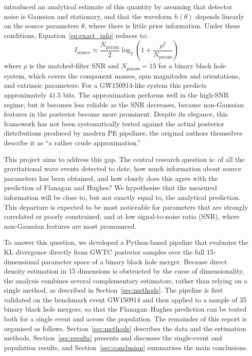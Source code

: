 \documentclass{phys400finalreport}
\begin{document}
\citet{Flanagan1998} introduced an analytical estimate of this quantity by
assuming that detector noise is Gaussian and stationary, and that the waveform
$h(\theta)$ depends linearly on the source parameters $\theta$, where there is
little prior information. Under these conditions, Equation~\ref{eq:exact_info}
reduces to:
\begin{equation}
I_\mathrm{source} \approx \frac{N_\mathrm{param}}{2} \log_2\left(1 + \frac{\rho^2}{N_\mathrm{param}}\right)
\label{eq:approx_info}
\end{equation}
where $\rho$ is the matched-filter SNR and $N_\mathrm{param} = 15$ for a binary
black hole system, which covers the component masses, spin magnitudes and
orientations, and extrinsic parameters. For a GW150914-like system this
predicts approximately $41.5$ bits. The approximation performs well in the
high-SNR regime, but it becomes less reliable as the SNR decreases, because
non-Gaussian features in the posterior become more prominent. Despite its
elegance, this framework has not been systematically tested against the actual
posterior distributions produced by modern PE pipelines; the original authors
themselves describe it as ``a rather crude approximation.''

This project aims to address this gap. The central research question is: of all
the gravitational wave events detected to date, how much information about
source parameters has been obtained, and how closely does this agree with the
prediction of Flanagan and Hughes? We hypothesise that the measured information
will be close to, but not exactly equal to, the analytical prediction. This
departure is expected to be most noticeable for parameters that are strongly
correlated or poorly constrained, and at low signal-to-noise ratio (SNR), where
non-Gaussian features are most pronounced.

To answer this question, we developed a Python-based pipeline that evaluates
the KL divergence directly from GWTC posterior samples over the full
15-dimensional parameter space of a binary black hole merger. Because direct
density estimation in 15 dimensions is obstructed by the curse of
dimensionality, the analysis combines several complementary estimators, rather
than relying on a single method, as described in Section~\ref{sec:methods}. The
pipeline is first validated on the benchmark event GW150914 and then applied to
a sample of 35 binary black hole mergers, so that the Flanagan--Hughes
prediction can be tested both for a single event and across the population. The
remainder of this report is organised as follows. Section~\ref{sec:methods}
describes the data and the estimation methods, Section~\ref{sec:results}
presents and discusses the single-event and population results, and
Section~\ref{sec:conclusion} summarises the main conclusions.
\end{document}
